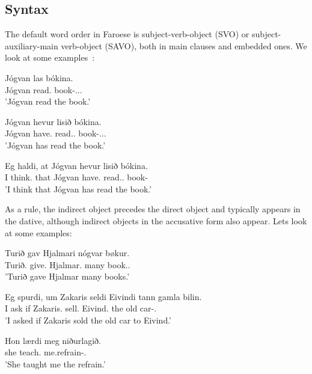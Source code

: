 \documentclass[12pt,%
    times,
]{lin-v2/lin}
\begin{document}
\subsection{Syntax}

The default word order in Faroese is subject-verb-object (SVO) or subject-auxiliary-main verb-object (SAVO), both in main clauses
and embedded ones. We look at some examples~\citep[236]{faroese}:
\begin{exe}
    \ex
    \begin{xlist}
        \item \gll Jógvan las bókina.\\
        Jógvan read.\Pst{} book-\Det.\Acc.\Sg.\F{}\\
        \trans 'Jógvan read the book.'
        \item \gll Jógvan hevur lisið bókina.\\
        Jógvan have.\Pst{} read.\Pst.\Ptcp{} book-\Det.\Acc.\Sg.\F{}\\
        \trans 'Jógvan has read the book.'
        \item \gll Eg haldi, at Jógvan hevur lisið bókina.\\
        I think.\Prs{} that Jógvan have.\Pst{} read.\Pst.\Ptcp{} book-\Det\\
        \trans 'I think that Jógvan has read the book.'
    \end{xlist}
\end{exe}

As a rule, the indirect object precedes the direct object and typically appears in the dative, although
indirect objects in the accusative form also appear. Lets look at some examples:
\begin{exe}
    \ex
    \begin{xlist}
        \item \gll Turið gav Hjalmari nógvar bøkur.\\
        Turið.\Nom{} give.\Pst{} Hjalmar.\Dat{} many book.\Nom.\Pl\\
        \trans 'Turið gave Hjalmar many books.'
        \item \gll Eg spurdi, um Zakaris seldi Eivindi tann gamla bilin.\\
        I ask if Zakaris.\Nom{} sell.\Pst{} Eivind.\Dat{} the old car-\Det.\Acc\\
        \trans 'I asked if Zakaris sold the old car to Eivind.'
        \item \gll Hon lærdi meg niðurlagið.\\
        she teach.\Pst{} me.\Acc refrain-\Det.\Acc\\
        \trans 'She taught me the refrain.'
    \end{xlist}
\end{exe}
\end{document}
